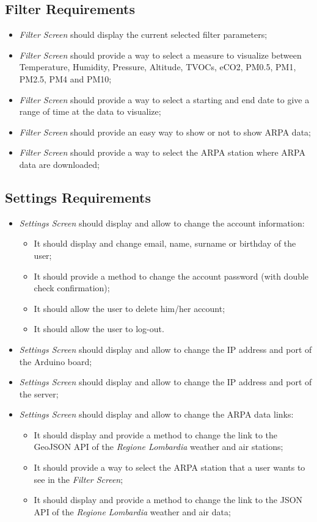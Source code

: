 \subsection{Filter Requirements}
\begin{itemize}
    \item \textit{Filter Screen} should display the current selected filter parameters;
    \item \textit{Filter Screen} should provide a way to select a measure to visualize between Temperature, Humidity, Pressure, Altitude, TVOCs, eCO2, PM0.5, PM1, PM2.5, PM4 and PM10;
    \item \textit{Filter Screen} should provide a way to select a starting and end date to give a range of time at the data to visualize;
    \item \textit{Filter Screen} should provide an easy way to show or not to show ARPA data;
    \item \textit{Filter Screen} should provide a way to select the ARPA station where ARPA data are downloaded;
\end{itemize}
    
\subsection{Settings Requirements}
\begin{itemize}
    \item \textit{Settings Screen} should display and allow to change the account information:
        \begin{itemize}
            \item It should display and change email, name, surname or birthday of the user;
            \item It should provide a method to change the account password (with double check confirmation);
            \item It should allow the user to delete him/her account;
            \item It should allow the user to log-out.
        \end{itemize}
    \item \textit{Settings Screen} should display and allow to change the IP address and port of the Arduino board;
    \item \textit{Settings Screen} should display and allow to change the IP address and port of the server;
    \item \textit{Settings Screen} should display and allow to change the ARPA data links:
        \begin{itemize}
            \item It should display and provide a method to change the link to the GeoJSON API of the \textit{Regione Lombardia} weather and air stations;
            \item It should provide a way to select the ARPA station that a user wants to see in the \textit{Filter Screen};
            \item It should display and provide a method to change the link to the JSON API of the \textit{Regione Lombardia} weather and air data;
        \end{itemize}
\end{itemize}

